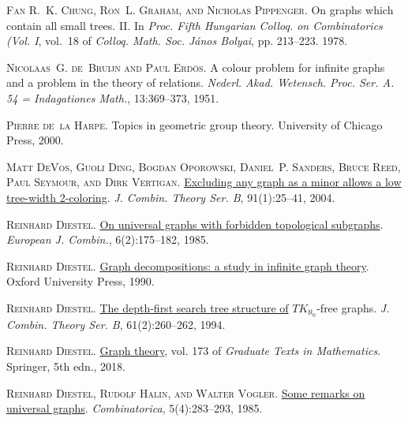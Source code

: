 \documentclass[a4paper,11pt]{article}
\theoremstyle{plain}
\theoremstyle{definition}
\begin{document}
\textsc{Fan R.~K. Chung, Ron~L. Graham, and Nicholas Pippenger}.
\newblock On graphs which contain all small trees. {II}.
\newblock In \emph{{P}roc. {F}ifth {H}ungarian {C}olloq. on Combinatorics
  ({V}ol. {I}}, vol.~18 of \emph{Colloq. Math. Soc. J\'{a}nos Bolyai}, pp.
  213--223. 1978.

\textsc{Nicolaas~G. de~Bruijn and Paul Erd\"{o}s}.
\newblock A colour problem for infinite graphs and a problem in the theory of
  relations.
\newblock \emph{Nederl. Akad. Wetensch. Proc. Ser. A. 54 = Indagationes Math.},
  13:369--373, 1951.

\textsc{Pierre de~la Harpe}.
\newblock Topics in geometric group theory.
\newblock University of Chicago Press, 2000.

\textsc{Matt DeVos, Guoli Ding, Bogdan Oporowski, Daniel~P. Sanders, Bruce
  Reed, Paul Seymour, and Dirk Vertigan}.
\newblock \href{https://doi.org/10.1016/j.jctb.2003.09.001}{Excluding any graph
  as a minor allows a low tree-width 2-coloring}.
\newblock \emph{J. Combin. Theory Ser. B}, 91(1):25--41, 2004.

\textsc{Reinhard Diestel}.
\newblock \href{https://doi.org/10.1016/S0195-6698(85)80008-1}{On universal
  graphs with forbidden topological subgraphs}.
\newblock \emph{European J. Combin.}, 6(2):175--182, 1985.

\textsc{Reinhard Diestel}.
\newblock \href{https://doi.org/10.1112/blms/24.1.90}{Graph decompositions: a
  study in infinite graph theory}.
\newblock Oxford University Press, 1990.

\textsc{Reinhard Diestel}.
\newblock \href{https://doi.org/10.1006/jctb.1994.1048}{The depth-first search tree structure of} {$TK_{\aleph_0}$}-free graphs. 
\newblock \emph{J. Combin. Theory Ser. B}, 61(2):260--262, 1994.

\textsc{Reinhard Diestel}.
\newblock \href{http://diestel-graph-theory.com/}{Graph theory}, vol. 173 of
  \emph{Graduate Texts in Mathematics}.
\newblock Springer, 5th edn., 2018.

\textsc{Reinhard Diestel, Rudolf Halin, and Walter Vogler}.
\newblock \href{https://doi.org/10.1007/BF02579242}{Some remarks on universal
  graphs}.
\newblock \emph{Combinatorica}, 5(4):283--293, 1985.
\end{document}

